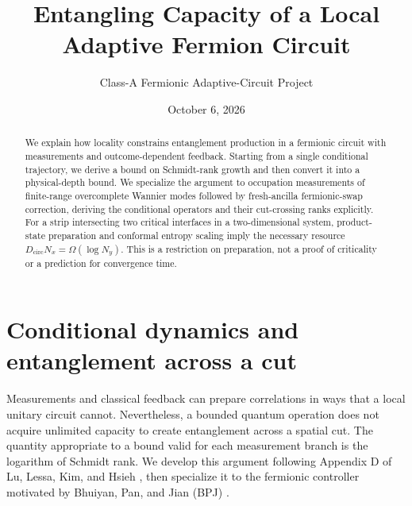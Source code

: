 \documentclass[aps,prb,onecolumn,nofootinbib,superscriptaddress]{revtex4-2}
\begin{document}
\title{Entangling Capacity of a Local Adaptive Fermion Circuit}
\author{Class-A Fermionic Adaptive-Circuit Project}
\noaffiliation
\date{October 6, 2026}
\begin{abstract}
We explain how locality constrains entanglement production in a fermionic
circuit with measurements and outcome-dependent feedback. Starting from a
single conditional trajectory, we derive a bound on Schmidt-rank growth and
then convert it into a physical-depth bound. We specialize the argument to
occupation measurements of finite-range overcomplete Wannier modes followed
by fresh-ancilla fermionic-swap correction, deriving the conditional
operators and their cut-crossing ranks explicitly. For a strip intersecting
two critical interfaces in a two-dimensional system, product-state
preparation and conformal entropy scaling imply the necessary resource
$D_{\mathrm{circ}}N_x=\Omega(\log N_y)$. This is a restriction on
preparation, not a proof of criticality or a prediction for convergence time.
\end{abstract}
\maketitle
\setcounter{tocdepth}{2}
\tableofcontents

\section{Conditional dynamics and entanglement across a cut}
\label{sec:conditional}
Measurements and classical feedback can prepare correlations in ways that a
local unitary circuit cannot. Nevertheless, a bounded quantum operation
does not acquire unlimited capacity to create entanglement across a spatial
cut. The quantity appropriate to a bound valid for each measurement branch
is the logarithm of Schmidt rank. We develop this argument following
Appendix D of Lu, Lessa, Kim, and Hsieh \cite{LuLessaKimHsieh2022}, then
specialize it to the fermionic controller motivated by Bhuiyan, Pan, and
Jian (BPJ) \cite{BhuiyanPanJian2026}.
\end{document}
